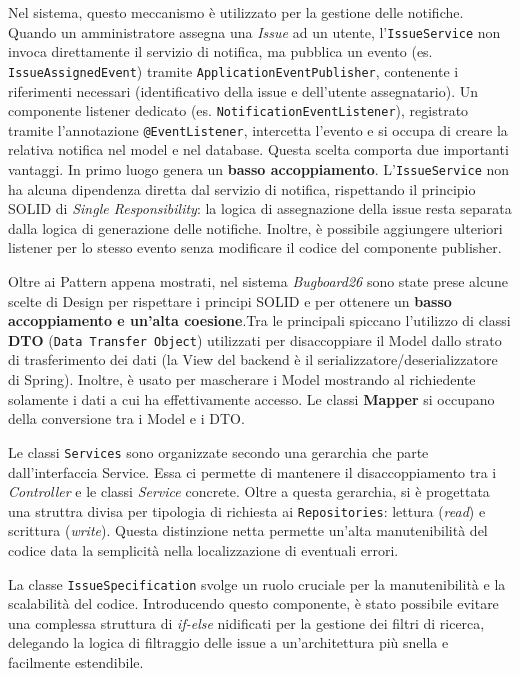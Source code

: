 \documentclass[a4paper,12pt]{article}
\begin{document}
\begin{itemize}
    Nel sistema, questo meccanismo è utilizzato per la gestione delle notifiche. Quando un amministratore assegna una \textit{Issue} ad un utente, l'\texttt{IssueService} non invoca direttamente il servizio di notifica, ma pubblica un evento (es. \texttt{IssueAssignedEvent}) tramite \texttt{ApplicationEventPublisher}, contenente i riferimenti necessari (identificativo della issue e dell'utente assegnatario). Un componente listener dedicato (es. \texttt{NotificationEventListener}), registrato tramite l'annotazione \texttt{@EventListener}, intercetta l'evento e si occupa di creare la relativa notifica nel model e nel database. Questa scelta comporta due importanti vantaggi. In primo luogo genera un \textbf{basso accoppiamento}. L'\texttt{IssueService} non ha alcuna dipendenza diretta dal servizio di notifica, rispettando il principio SOLID di \textit{Single Responsibility}: la logica di assegnazione della issue resta separata dalla logica di generazione delle notifiche. Inoltre, è possibile aggiungere ulteriori listener per lo stesso evento senza modificare il codice del componente publisher.
\end{itemize}

Oltre ai Pattern appena mostrati, nel sistema \textit{Bugboard26} sono state prese alcune scelte di Design per rispettare i principi SOLID e per ottenere un \textbf{basso accoppiamento e un'alta coesione}.Tra le principali spiccano l'utilizzo di classi \textbf{DTO} (\texttt{Data Transfer Object}) utilizzati per disaccoppiare il Model dallo strato di trasferimento dei dati (la View del backend è il serializzatore/deserializzatore di Spring). Inoltre, è usato per mascherare i Model mostrando al richiedente solamente i dati a cui ha effettivamente accesso. Le classi \textbf{Mapper} si occupano della conversione tra i Model e i DTO.

Le classi \texttt{Services} sono organizzate secondo una gerarchia che parte dall'interfaccia Service. Essa ci permette di mantenere il disaccoppiamento tra i \textit{Controller} e le classi \textit{Service} concrete. Oltre a questa gerarchia, si è progettata una struttra divisa per tipologia di richiesta ai \texttt{Repositories}: lettura (\textit{read}) e scrittura (\textit{write}). Questa distinzione netta permette un'alta manutenibilità del codice data la semplicità nella localizzazione di eventuali errori. 

La classe \texttt{IssueSpecification} svolge un ruolo cruciale per la manutenibilità e la scalabilità del codice. Introducendo questo componente, è stato possibile evitare una complessa struttura di \textit{if-else} nidificati per la gestione dei filtri di ricerca, delegando la logica di filtraggio delle issue a un'architettura più snella e facilmente estendibile.
\end{document}
